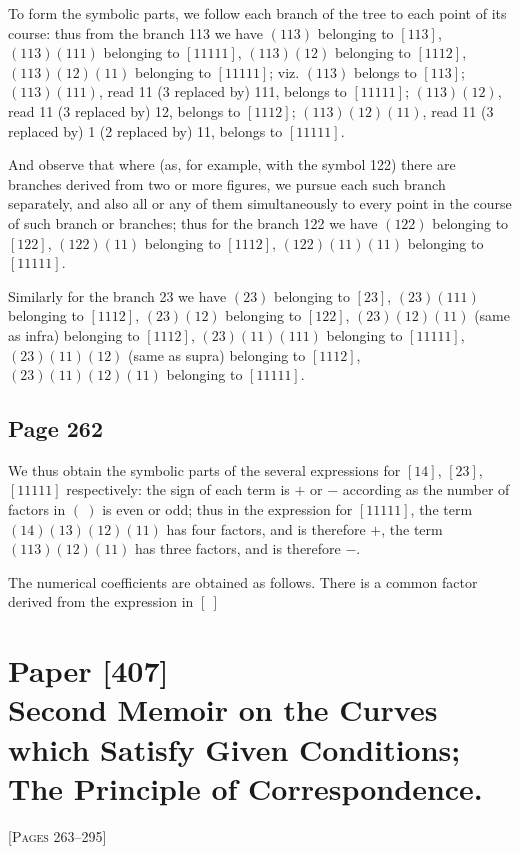 \documentclass[11pt,a4paper]{article}
\theoremstyle{definition}
\begin{document}
To form the symbolic parts, we follow each branch of the tree to each point of its course: thus from the branch 113 we have $(113)$ belonging to $[113]$, $(113)(111)$ belonging to $[11111]$, $(113)(12)$ belonging to $[1112]$, $(113)(12)(11)$ belonging to $[11111]$; viz. $(113)$ belongs to $[113]$; $(113)(111)$, read 11 (3 replaced by) 111, belongs to $[11111]$; $(113)(12)$, read 11 (3 replaced by) 12, belongs to $[1112]$; $(113)(12)(11)$, read 11 (3 replaced by) 1 (2 replaced by) 11, belongs to $[11111]$.

And observe that where (as, for example, with the symbol 122) there are branches derived from two or more figures, we pursue each such branch separately, and also all or any of them simultaneously to every point in the course of such branch or branches; thus for the branch 122 we have $(122)$ belonging to $[122]$, $(122)(11)$ belonging to $[1112]$, $(122)(11)(11)$ belonging to $[11111]$.

Similarly for the branch 23 we have $(23)$ belonging to $[23]$, $(23)(111)$ belonging to $[1112]$, $(23)(12)$ belonging to $[122]$, $(23)(12)(11)$ (same as infra) belonging to $[1112]$, $(23)(11)(111)$ belonging to $[11111]$, $(23)(11)(12)$ (same as supra) belonging to $[1112]$, $(23)(11)(12)(11)$ belonging to $[11111]$.

\subsection*{Page 262}

We thus obtain the symbolic parts of the several expressions for $[14]$, $[23]$, $[11111]$ respectively: the sign of each term is $+$ or $-$ according as the number of factors in $(\ )$ is even or odd; thus in the expression for $[11111]$, the term $(14)(13)(12)(11)$ has four factors, and is therefore $+$, the term $(113)(12)(11)$ has three factors, and is therefore $-$.

The numerical coefficients are obtained as follows. There is a common factor derived from the expression in $[\ ]$

\newpage
\section*{Paper [407]\\
\textnormal{Second Memoir on the Curves which Satisfy Given Conditions;\\
The Principle of Correspondence.}}

\vspace{6pt}
\noindent\textsc{[Pages 263--295]}
\vspace{6pt}
\end{document}
